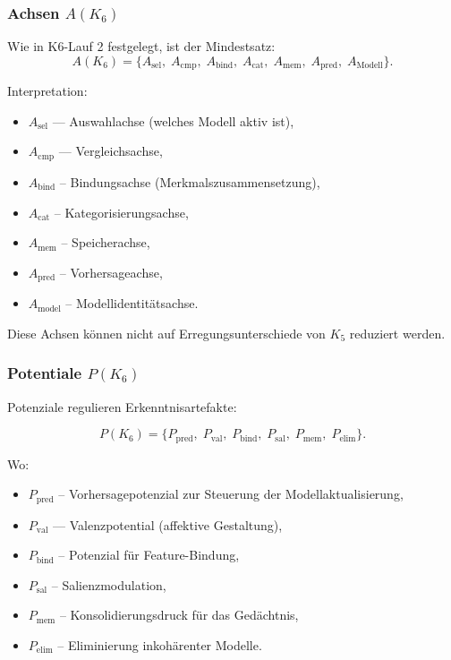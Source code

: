 \subsubsection{Achsen \texorpdfstring{$A(K_6)$}{A(K_6)}}

Wie in K6-Lauf 2 festgelegt, ist der Mindestsatz:
\[
A(K_6) = \{
A_{\mathrm{sel}},\;
A_{\mathrm{cmp}},\;
A_{\mathrm{bind}},\;
A_{\mathrm{cat}},\;
A_{\mathrm{mem}},\;
A_{\mathrm{pred}},\;
A_{\mathrm{Modell}}
\}.
\]

Interpretation:
\begin{itemize}
    \item $A_{\mathrm{sel}}$ — Auswahlachse (welches Modell aktiv ist),
    \item $A_{\mathrm{cmp}}$ — Vergleichsachse,
    \item $A_{\mathrm{bind}}$ – Bindungsachse (Merkmalszusammensetzung),
    \item $A_{\mathrm{cat}}$ – Kategorisierungsachse,
    \item $A_{\mathrm{mem}}$ – Speicherachse,
    \item $A_{\mathrm{pred}}$ – Vorhersageachse,
    \item $A_{\mathrm{model}}$ – Modellidentitätsachse.
\end{itemize}

Diese Achsen können nicht auf Erregungsunterschiede von $K_5$ reduziert werden.

\subsubsection{Potentiale \texorpdfstring{$P(K_6)$}{P(K_6)}}

Potenziale regulieren Erkenntnisartefakte:

\[
P(K_6)=
\{
P_{\mathrm{pred}},\;
P_{\mathrm{val}},\;
P_{\mathrm{bind}},\;
P_{\mathrm{sal}},\;
P_{\mathrm{mem}},\;
P_{\mathrm{elim}}
\}.
\]

Wo:
\begin{itemize}
    \item $P_{\mathrm{pred}}$ – Vorhersagepotenzial zur Steuerung der Modellaktualisierung,
    \item $P_{\mathrm{val}}$ — Valenzpotential (affektive Gestaltung),
    \item $P_{\mathrm{bind}}$ – Potenzial für Feature-Bindung,
    \item $P_{\mathrm{sal}}$ – Salienzmodulation,
    \item $P_{\mathrm{mem}}$ – Konsolidierungsdruck für das Gedächtnis,
    \item $P_{\mathrm{elim}}$ – Eliminierung inkohärenter Modelle.
\end{itemize}

